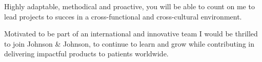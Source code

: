 \documentclass[11pt, a4paper]{awesome-cv}
\begin{document}
\begin{cvletter}
Highly adaptable, methodical and proactive, you will be able to count on me to lead projects to succes in a cross-functional and cross-cultural environment.

Motivated to be part of an international and innovative team I would be thrilled to join Johnson \& Johnson, to continue to learn and grow while contributing in delivering impactful products to patients worldwide.

\end{cvletter}

\makeletterclosing
\end{document}
